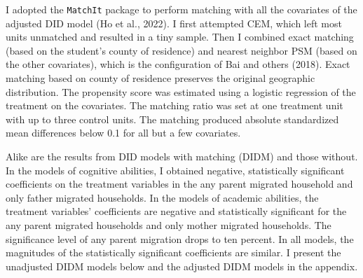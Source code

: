 \documentclass[
  man,floatsintext]{apa7}
\begin{document}
I adopted the \texttt{MatchIt} package to perform matching with all the covariates of the adjusted DID model (Ho et al., 2022). I first attempted CEM, which left most units unmatched and resulted in a tiny sample. Then I combined exact matching (based on the student's county of residence) and nearest neighbor PSM (based on the other covariates), which is the configuration of Bai and others (2018). Exact matching based on county of residence preserves the original geographic distribution. The propensity score was estimated using a logistic regression of the treatment on the covariates. The matching ratio was set at one treatment unit with up to three control units. The matching produced absolute standardized mean differences below 0.1 for all but a few covariates.

Alike are the results from DID models with matching (DIDM) and those without. In the models of cognitive abilities, I obtained negative, statistically significant coefficients on the treatment variables in the any parent migrated household and only father migrated households. In the models of academic abilities, the treatment variables' coefficients are negative and statistically significant for the any parent migrated households and only mother migrated households. The significance level of any parent migration drops to ten percent. In all models, the magnitudes of the statistically significant coefficients are similar. I present the unadjusted DIDM models below and the adjusted DIDM models in the appendix.
\end{document}
